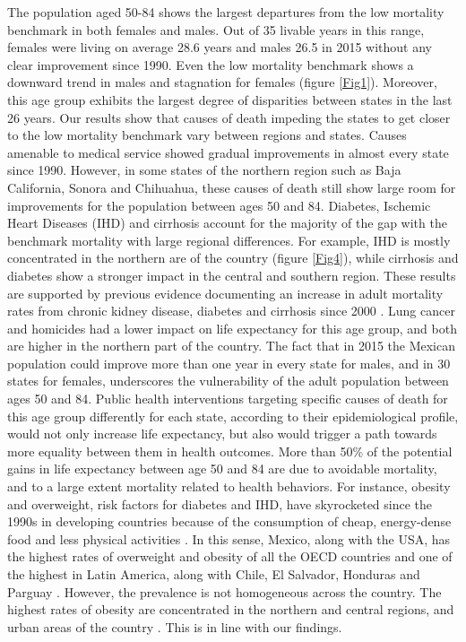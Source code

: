 \documentclass{bmcart}
\begin{document}
The population aged 50-84 shows the largest departures from the low mortality benchmark in both females and males. Out of 35 livable years in this range, females were living on average 28.6 years and males 26.5 in 2015 without any clear improvement since 1990. Even the low mortality benchmark shows a downward trend in males and stagnation for females (figure \ref{Fig1}). Moreover, this age group exhibits the largest degree of disparities between states in the last 26 years. Our results show that causes of death impeding the states to get closer to the low mortality benchmark vary between regions and states. Causes amenable to medical service showed gradual improvements in almost every state since 1990. However, in some states of the northern region such as Baja California, Sonora and Chihuahua, these causes of death still show large room for improvements for the population between ages 50 and 84. Diabetes, Ischemic Heart Diseases (IHD) and cirrhosis account for the majority of the gap with the benchmark mortality with large regional differences. For example, IHD is mostly concentrated in the northern are of the country (figure \ref{Fig4}), while cirrhosis and diabetes show a stronger impact in the central and southern region. These results are supported by previous evidence documenting an increase in adult mortality rates from chronic kidney disease, diabetes and cirrhosis since 2000 \cite{gomez2016dissonant}. Lung cancer and homicides had a lower impact on life expectancy for this age group, and both are higher in the northern part of the country. The fact that in 2015 the Mexican population could improve more than one year in every state for males, and in 30 states for females, underscores the vulnerability of the adult population between ages 50 and 84. Public health interventions targeting specific causes of death for this age group differently for each state, according to their epidemiological profile, would not only increase life expectancy, but also would trigger a path towards more equality between them in health outcomes. More than 50\% of the potential gains in life expectancy between age 50 and 84 are due to avoidable mortality, and to a large extent mortality related to health behaviors. For instance, obesity and overweight, risk factors for diabetes and IHD, have skyrocketed since the 1990s in developing countries because of the consumption of cheap, energy-dense food and less physical activities \cite{hossain2007obesity}. In this sense, Mexico, along with the USA, has the highest rates of overweight and obesity of all the OECD countries  \cite{gonzalez2016mexico} and one of the highest in Latin America, along with Chile, El Salvador, Honduras and Parguay \cite{aschner2016obesity}. However, the prevalence is not homogeneous across the country. The highest rates of obesity are concentrated in the northern and central regions\cite{gonzalez2016mexico}, and urban areas of the country \cite{kuri2009prevalence}. This is in line with our findings.
\end{document}
